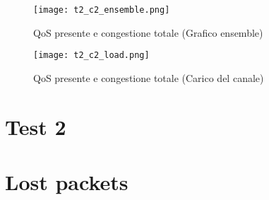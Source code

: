 \begin{figure}[h!]
    \centering
    \texttt{[image: t2\_c2\_ensemble.png]}
    \caption{QoS presente e congestione totale (Grafico ensemble)}
    \label{fig:t2_c2_ensemble}
\end{figure}
\clearpage
\begin{figure}[h!]
    \centering
    \texttt{[image: t2\_c2\_load.png]}
    \caption{QoS presente e congestione totale (Carico del canale)}
    \label{fig:t2_c2_load}
\end{figure}
\section{Test 2}

\section{Lost packets}